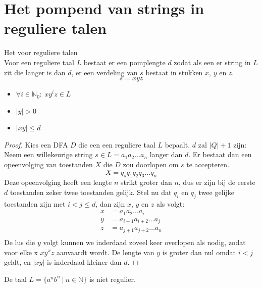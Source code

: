 \documentclass[main.tex]{subfiles}
\begin{document}
\section{Het pompend van strings in reguliere talen}
\label{sec:het-pompend-van}

\begin{lem}
  Het  voor reguliere talen\\
  Voor een reguliere taal $L$ bestaat er een pomplengte $d$ zodat als een er string in $L$ zit die langer is dan $d$, er een verdeling van $s$ bestaat in stukken $x$, $y$ en $z$.
  \[ s = xyz \]
  \begin{itemize}
  \item $\forall i \in \mathbb{N}_{0}:\ xy^{i}z \in L$
  \item $|y| > 0$
  \item $|xy| \le d$
  \end{itemize}

  \begin{proof}
    Kies een DFA $D$ die een een reguliere taal $L$ bepaalt.
    $d$ zal $|Q| + 1$ zijn:
    Neem een willekeurige string $s\in L = a_{1}a_{2}\ldots a_{n}$ langer dan $d$.
    Er bestaat dan een opeenvolging van toestanden $X$ die $D$ zou doorlopen om $s$ te accepteren.
    \[ X = q_{s}q_{1}q_{2}q_{3}\ldots q_{n} \]
    Deze opeenvolging heeft een lengte $n$ strikt groter dan $n$, dus er zijn bij de eerste $d$ toestanden zeker twee toestanden gelijk.
    Stel nu dat $q_{i}$ en $q_{j}$ twee gelijke toestanden zijn met $i < j \le d$, dan zijn $x$, $y$ en $z$ als volgt:
    \[
    \begin{array}{rl}
      x &= a_{1}a_{2}\ldots a_{i}\\
      y &= a_{i+1}a_{i+2}\ldots a_{j}\\
      z &= a_{j+1}a_{j+2}\ldots a_{n}\\
    \end{array}
    \]
    De lus die $y$ volgt kunnen we inderdaad zoveel keer overlopen als nodig, zodat voor elke x $xy^{x}z$ aanvaardt wordt.
    De lengte van $y$ is groter dan nul omdat $i < j$ geldt, en $|xy|$ is inderdaad kleiner dan $d$.
  \end{proof}

\end{lem}

\begin{st}
  De taal $L= \{ a^{n}b^{n} \ |\ n\in \mathbb{N} \} $ is niet regulier.

\end{st}
\end{document}
